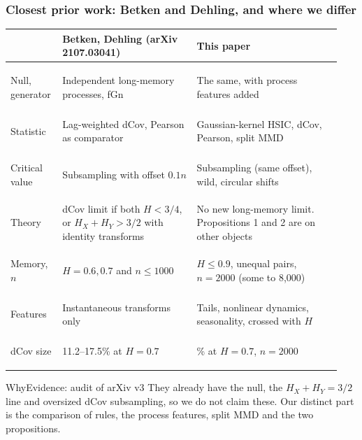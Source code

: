 \documentclass[11pt, aspectratio=169, xcolor={dvipsnames}]{beamer}
\newenvironment{why}[1]{\begin{block}{Why\hfill\normalfont\footnotesize Evidence: #1}\small
  \setlength{\leftmargini}{1.2em}}{\end{block}}
\begin{document}
\begin{frame}
\frametitle{Closest prior work: Betken and Dehling, and where we differ}
\footnotesize
\renewcommand{\arraystretch}{1.0}
\vspace{-2mm}
\begin{tabular}{@{}>{\bfseries\raggedright}p{0.13\linewidth}>{\raggedright}p{0.39\linewidth}>{\raggedright\arraybackslash}p{0.42\linewidth}@{}}
\toprule
& Betken, Dehling (arXiv 2107.03041) & This paper \\
\midrule
Null, generator & Independent long-memory processes, fGn & The same, with process features added \\
Statistic & Lag-weighted dCov, Pearson as comparator & Gaussian-kernel HSIC, dCov, Pearson, split MMD \\
Critical value & Subsampling with offset $0.1n$ & Subsampling (same offset), wild, circular shifts \\
Theory & dCov limit if both $H<3/4$, or $H_X+H_Y>3/2$ with identity transforms & No new long-memory limit. Propositions 1 and 2 are on other objects \\
Memory, $n$ & $H=0.6, 0.7$ and $n\le1000$ & $H\le0.9$, unequal pairs, $n=2000$ (some to 8,000) \\
Features & Instantaneous transforms only & Tails, nonlinear dynamics, seasonality, crossed with $H$ \\
dCov size & 11.2--17.5\% at $H=0.7$ & 10.6\% at $H=0.7$, $n=2000$ \\
\bottomrule
\end{tabular}
\begin{why}{audit of arXiv v3}
They already have the null, the $H_X+H_Y=3/2$ line and oversized dCov subsampling, so we do not claim these. Our distinct part is the comparison of rules, the process features, split MMD and the two propositions.
\end{why}
\end{frame}
\end{document}
